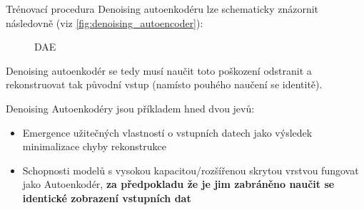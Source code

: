 Trénovací procedura Denoising autoenkodéru lze schematicky znázornit následovně (viz \autoref{fig:denoising_autoencoder}):

\begin{figure}[H]
    \centering
    \caption{DAE}
    \label{fig:denoising_autoencoder}
\end{figure}

Denoising autoenkodér se tedy musí naučit toto poškození odstranit a rekonstruovat tak původní vstup (namísto pouhého naučení se identitě).

Denoising Autoenkodéry jsou příkladem hned dvou jevů:
\begin{itemize}
    \item Emergence užitečných vlastností o vstupních datech jako výsledek minimalizace chyby rekonstrukce
    \item Schopnosti modelů s vysokou kapacitou/rozšířenou skrytou vrstvou fungovat jako Autoenkodér, \textbf{za předpokladu že je jim zabráněno naučit se identické zobrazení vstupních dat}
\end{itemize}